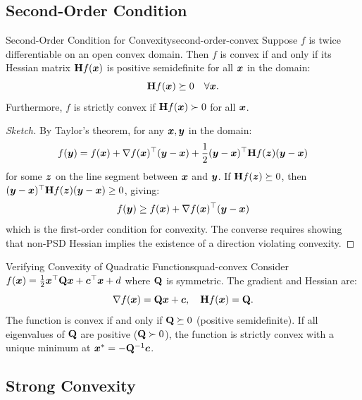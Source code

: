 \documentclass[../../main.tex]{subfiles}
\begin{document}
\subsection{Second-Order Condition}

\begin{theorem}{Second-Order Condition for Convexity}{second-order-convex}
Suppose $f$ is twice differentiable on an open convex domain. Then $f$ is convex if and only if its Hessian matrix $\mathbf{H} f(\boldsymbol{x})$ is positive semidefinite for all $\boldsymbol{x}$ in the domain:
\[
    \mathbf{H} f(\boldsymbol{x}) \succeq 0 \quad \forall \boldsymbol{x}.
\]
Furthermore, $f$ is strictly convex if $\mathbf{H} f(\boldsymbol{x}) \succ 0$ for all $\boldsymbol{x}$.
\end{theorem}

\begin{proof}[Sketch]
By Taylor's theorem, for any $\boldsymbol{x}, \boldsymbol{y}$ in the domain:
\[
    f(\boldsymbol{y}) = f(\boldsymbol{x}) + \nabla f(\boldsymbol{x})^\top(\boldsymbol{y} - \boldsymbol{x}) + \frac{1}{2}(\boldsymbol{y} - \boldsymbol{x})^\top \mathbf{H} f(\boldsymbol{z})(\boldsymbol{y} - \boldsymbol{x})
\]
for some $\boldsymbol{z}$ on the line segment between $\boldsymbol{x}$ and $\boldsymbol{y}$. If $\mathbf{H} f(\boldsymbol{z}) \succeq 0$, then $(\boldsymbol{y} - \boldsymbol{x})^\top \mathbf{H} f(\boldsymbol{z})(\boldsymbol{y} - \boldsymbol{x}) \geq 0$, giving:
\[
    f(\boldsymbol{y}) \geq f(\boldsymbol{x}) + \nabla f(\boldsymbol{x})^\top(\boldsymbol{y} - \boldsymbol{x})
\]
which is the first-order condition for convexity. The converse requires showing that non-PSD Hessian implies the existence of a direction violating convexity.
\end{proof}

\begin{example}{Verifying Convexity of Quadratic Functions}{quad-convex}
Consider $f(\boldsymbol{x}) = \frac{1}{2}\boldsymbol{x}^\top \mathbf{Q} \boldsymbol{x} + \boldsymbol{c}^\top \boldsymbol{x} + d$ where $\mathbf{Q}$ is symmetric. The gradient and Hessian are:
\[
    \nabla f(\boldsymbol{x}) = \mathbf{Q}\boldsymbol{x} + \boldsymbol{c}, \quad \mathbf{H} f(\boldsymbol{x}) = \mathbf{Q}.
\]
The function is convex if and only if $\mathbf{Q} \succeq 0$ (positive semidefinite). If all eigenvalues of $\mathbf{Q}$ are positive ($\mathbf{Q} \succ 0$), the function is strictly convex with a unique minimum at $\boldsymbol{x}^* = -\mathbf{Q}^{-1} \boldsymbol{c}$.
\end{example}

\subsection{Strong Convexity}
\end{document}
